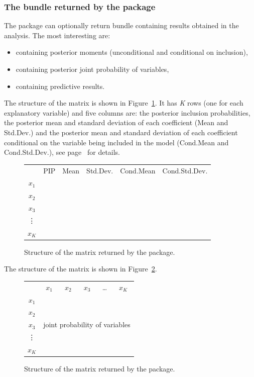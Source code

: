 \subsubsection[The bundle returned by the BMA package]{The bundle returned by the  package}
The  package can optionally return bundle containing
results obtained in the analysis. The most interesting are:
\begin{itemize}
	\item {} containing posterior moments
	(unconditional and conditional on inclusion),
	\item {} containing posterior joint probability of variables,
	\item {} containing predictive results.
\end{itemize}


The structure of the  matrix is
shown in Figure~\ref{fig:BMA_Post_Results_matrix_structure}.
It has \textit{K} rows (one for each explanatory variable)
and five columns are: the posterior inclusion probabilities, the
posterior mean and standard deviation of each coefficient (Mean and
Std.Dev.) and the posterior mean and standard deviation of each
coefficient conditional on the variable being included in the model
(Cond.Mean and Cond.Std.Dev.), see page~\pageref{sec:outputs} for
details.

\begin{figure}[ht!]
	\centering
	\begin{tabular}{cccccc}\hline
		& PIP & Mean & Std.Dev. & Cond.Mean & Cond.Std.Dev.\\
		$x_1$ & & & & &\\
		$x_2$ & & & & &\\
		$x_3$ & & & & &\\
		\vdots & & & & &\\
		$x_K$ & & & & &\\\hline
	\end{tabular}
	\caption{Structure of the  matrix returned by the  package.}
	\label{fig:BMA_Post_Results_matrix_structure}
\end{figure}

The structure of the  matrix is
shown in Figure~\ref{fig:BMA_jointness_m_matrix_structure}.

\begin{figure}[ht!]
	\centering
	\begin{tabular}{cccccc}\hline
		& $x_1$ &$x_2$ &$x_3$ &\ldots&$x_K$\\
		$x_1$  &&&&&\\
		$x_2$  &&&&&\\
		$x_3$  & \multicolumn{5}{c}{joint probability of variables}\\
		\vdots &&&&&\\
		$x_K$  &&&&&\\\hline
	\end{tabular}
	\caption{Structure of the  matrix returned by the  package.}
	\label{fig:BMA_jointness_m_matrix_structure}
\end{figure}
 
